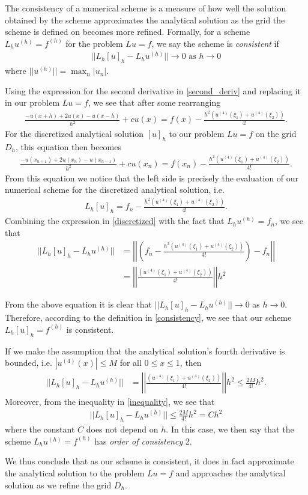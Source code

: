 The consistency of a numerical scheme is a measure of how well the solution
obtained by the scheme approximates the analytical solution as the grid
the scheme is defined on becomes more refined. Formally,
for a scheme $L_h u^{(h)} = f^{(h)}$ for the problem $Lu = f$, we say the
scheme is \textit{consistent} if
\begin{align}\label{consistency}
  ||L_h[u]_h - L_h u^{(h)}|| \to 0 \text{\ as $h \to 0$}
\end{align}
where $|| u^{(h)} || = \max_n |u_n|$.

Using the expression for the second
derivative in \eqref{second_deriv} and replacing it in our problem $Lu = f$, we
see that after some rearranging
\begin{align*}
  \frac{-u(x + h) + 2u(x) - u(x-h)}{h^2} + cu(x) = f(x) - \frac{h^2(u^{(4)}(\xi_1) + u^{(4)}(\xi_2))}{4!}.
\end{align*}
For the discretized analytical solution $[u]_h$ to our problem $Lu = f$ on the grid $D_h$,
this equation then becomes
\begin{align*}
  \frac{-u(x_{n+1}) + 2u(x_n) - u(x_{n-1})}{h^2} + cu(x_n) = f(x_n) - \frac{h^2(u^{(4)}(\xi_1) + u^{(4)}(\xi_2))}{4!}.
\end{align*}
From this equation we notice that the left side is precisely the evaluation
of our numerical scheme for the discretized analytical solution, i.e.
\begin{align}\label{discretized}
  L_h[u]_h = f_n - \frac{h^2(u^{(4)}(\xi_1) + u^{(4)}(\xi_2))}{4!}.
\end{align}
Combining the expression in \eqref{discretized} with the fact that
$L_hu^{(h)} = f_n$, we see that
\begin{align*}
  ||L_h[u]_h - L_hu^{(h)}||
  &= \left|\left| \left(f_n - \frac{h^2(u^{(4)}(\xi_1) + u^{(4)}(\xi_2))}{4!}\right) - f_n \right|\right| \\
  &= \left|\left| \frac{(u^{(4)}(\xi_1) + u^{(4)}(\xi_2))}{4!}\right|\right| h^2
\end{align*}

From the above equation it is clear that $||L_h[u]_h - L_hu^{(h)}|| \to 0$ as $h \to 0$.
Therefore, according to the definition in \eqref{consistency}, we see that
our scheme $L_h[u]_h = f^{(h)}$ is consistent.

If we make the assumption that the analytical solution's fourth derivative
is bounded, i.e. $|u^{(4)}(x)| \leq M$ for all $0 \leq x \leq 1$, then
\begin{align}\label{inequality}
  ||L_h[u]_h - L_hu^{(h)}||
  &= \left|\left| \frac{(u^{(4)}(\xi_1) + u^{(4)}(\xi_2))}{4!}\right|\right| h^2 \leq \frac{2M}{4!}h^2.
\end{align}
Moreover, from the inequality in \eqref{inequality}, we see that
\begin{align}\label{order}
  ||L_h[u]_h - L_hu^{(h)}|| \leq \frac{2M}{4!}h^2 = Ch^2
\end{align}
where the constant $C$ does not depend on $h$. In this case, we then say that
the scheme $L_h u^{(h)} = f^{(h)}$ has \textit{order of consistency} 2.

We thus conclude that as our scheme is consistent, it does in fact approximate
the analytical solution to the problem $Lu = f$ and approaches the analytical
solution as we refine the grid $D_h$.
